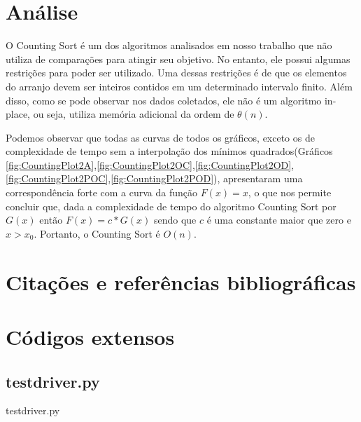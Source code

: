 \documentclass[12pt,a4paper,twoside]{report}
\begin{document}
\chapter{Análise}

O Counting Sort é um dos algoritmos analisados em nosso trabalho que não utiliza de comparações para atingir seu objetivo. No entanto, ele possui algumas restrições para poder ser utilizado. Uma dessas restrições é de que os elementos do arranjo devem ser inteiros contidos em um determinado intervalo finito. Além disso, como se pode observar nos dados coletados, ele não é um algoritmo in-place, ou seja, utiliza memória adicional da ordem de $\theta (n)$.

Podemos observar que todas as curvas de todos os gráficos, exceto os de complexidade de tempo sem a interpolação dos mínimos quadrados(Gráficos \ref{fig:CountingPlot2A},\ref{fig:CountingPlot2OC},\ref{fig:CountingPlot2OD},\ref{fig:CountingPlot2POC},\ref{fig:CountingPlot2POD}), apresentaram uma correspondência forte com a curva da função $F(x) = x$, o que nos permite concluir que, dada a complexidade de tempo do algoritmo Counting Sort por $G(x)$ então $F(x) = c * G(x)$ sendo que $c$ é uma constante maior que zero e $x > x_0$. Portanto, o Counting Sort é $O(n)$.

\chapter{Citações e referências bibliográficas}








\clearpage
{}
\appendix

\chapter{Códigos extensos \label{ap:testdriver}}
\section{testdriver.py}
 {testdriver.py}
\end{document}
